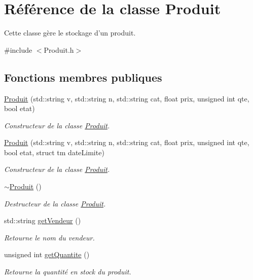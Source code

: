 \hypertarget{class_produit}{\section{Référence de la classe Produit}
\label{class_produit}
}


Cette classe gère le stockage d'un produit.  




{\ttfamily \#include $<$Produit.\-h$>$}

\subsection*{Fonctions membres publiques}
\begin{DoxyCompactItemize}
\item 
\hyperlink{class_produit_a5b23bea0ed80afaa80e6e0d6b01d68a8}{Produit} (std\-::string v, std\-::string n, std\-::string cat, float prix, unsigned int qte, bool etat)
\begin{DoxyCompactList}\small\item\em Constructeur de la classe \hyperlink{class_produit}{Produit}. \end{DoxyCompactList}\item 
\hyperlink{class_produit_ac0136c815dafc47b3959c5fd5ee763cd}{Produit} (std\-::string v, std\-::string n, std\-::string cat, float prix, unsigned int qte, bool etat, struct tm date\-Limite)
\begin{DoxyCompactList}\small\item\em Constructeur de la classe \hyperlink{class_produit}{Produit}. \end{DoxyCompactList}\item 
\hyperlink{class_produit_a7b789cfa3048436fd050cb565b499c03}{$\sim$\-Produit} ()
\begin{DoxyCompactList}\small\item\em Destructeur de la classe \hyperlink{class_produit}{Produit}. \end{DoxyCompactList}\item 
std\-::string \hyperlink{class_produit_abb06f356f5471dfc236f17412d4a6749}{get\-Vendeur} ()
\begin{DoxyCompactList}\small\item\em Retourne le nom du vendeur. \end{DoxyCompactList}\item 
unsigned int \hyperlink{class_produit_a4fc3e3d0c67b9b17e6c0e20cfec70c3b}{get\-Quantite} ()
\begin{DoxyCompactList}\small\item\em Retourne la quantité en stock du produit. \end{DoxyCompactList}\item 

\end{DoxyCompactItemize}

